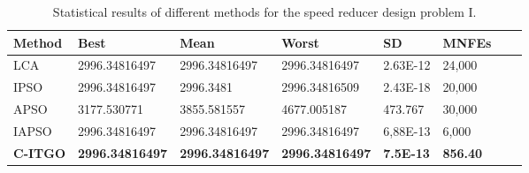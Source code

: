 
\begin{table*}[tp]
    \tiny
    \begin{center}
    
    \begin{tabular}{ P{2.0cm} P{2.0cm} P{2.0cm} P{2.0cm} P{2.0cm} P{2.0cm} P{2.0cm} P{2.0cm}  }
    \hline
    \textbf{Method} & \textbf{Best} & \textbf{Mean} & \textbf{Worst} & \textbf{SD} & \textbf{MNFEs} \\
    \hline
    
    LCA & 2996.34816497 & 2996.34816497 & 2996.34816497 & 2.63E-12 & 24,000 \\
    IPSO & 2996.34816497 & 2996.3481 & 2996.34816509 & 2.43E-18 & 20,000 \\
    APSO & 3177.530771 & 3855.581557 & 4677.005187 & 473.767 & 30,000 \\  
    IAPSO & 2996.34816497 & 2996.34816497 & 2996.34816497 & 6,88E-13 & 6,000 \\
    \textbf{C-ITGO} & \bf{2996.34816497} & \bf{2996.34816497} & \bf{2996.34816497} & \bf{7.5E-13} & \bf{856.40} \\
        
    \hline
    \end{tabular}
    \end{center}
    \vspace*{-6mm}
    \caption{Statistical results of different methods for the speed reducer design problem I. \\[1em]}
    \label{tab:SP1}
    \end{table*}
    
    